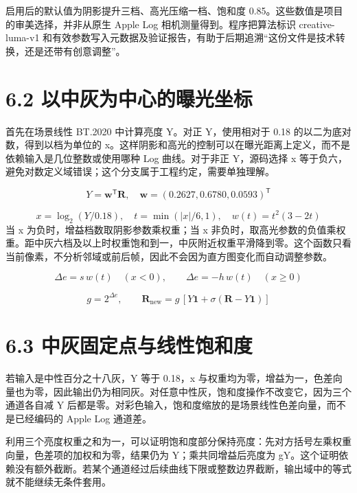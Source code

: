 \documentclass[UTF8,zihao=-4,openany]{ctexbook}
\begin{document}
启用后的默认值为阴影提升三档、高光压缩一档、饱和度 0.85。这些数值是项目的审美选择，并非从原生 Apple Log 相机测量得到。程序把算法标识 creative-luma-v1 和有效参数写入元数据及验证报告，有助于后期追溯“这份文件是技术转换，还是还带有创意调整”。


\section*{6.2 以中灰为中心的曝光坐标}
首先在场景线性 BT.2020 中计算亮度 Y。对正 Y，使用相对于 0.18 的以二为底对数，得到以档为单位的 x。这样阴影和高光的控制可以在曝光距离上定义，而不是依赖输入是几位整数或使用哪种 Log 曲线。对于非正 Y，源码选择 x 等于负六，避免对数定义域错误；这个分支属于工程约定，需要单独理解。


\begin{equation}
Y=\mathbf{w}^{\mathsf T}\mathbf{R},\quad \mathbf{w}=(0.2627,0.6780,0.0593)^{\mathsf T}
\end{equation}

\begin{equation}
x=\log_2(Y/0.18),\quad t=\min(|x|/6,1),\quad w(t)=t^2(3-2t)
\end{equation}
当 x 为负时，增益档数取阴影参数乘权重；当 x 非负时，取高光参数的负值乘权重。距中灰六档及以上时权重饱和到一，中灰附近权重平滑降到零。这个函数只看当前像素，不分析邻域或前后帧，因此不会因为直方图变化而自动调整参数。


\begin{equation}
\Delta e=s\,w(t)\quad(x<0),\qquad \Delta e=-h\,w(t)\quad(x\geq0)
\end{equation}

\begin{equation}
g=2^{\Delta e},\qquad \mathbf{R}_{\mathrm{new}}=g\,[Y\mathbf{1}+\sigma(\mathbf{R}-Y\mathbf{1})]
\end{equation}

\section*{6.3 中灰固定点与线性饱和度}
若输入是中性百分之十八灰，Y 等于 0.18，x 与权重均为零，增益为一，色差向量也为零，因此输出仍为相同灰。对任意中性灰，饱和度操作不改变它，因为三个通道各自减 Y 后都是零。对彩色输入，饱和度缩放的是场景线性色差向量，而不是已经编码的 Apple Log 通道差。

利用三个亮度权重之和为一，可以证明饱和度部分保持亮度：先对方括号左乘权重向量，色差项的加权和为零，结果仍为 Y；乘共同增益后亮度为 gY。这个证明依赖没有额外截断。若某个通道经过后续曲线下限或整数边界截断，输出域中的等式就不能继续无条件套用。
\end{document}
